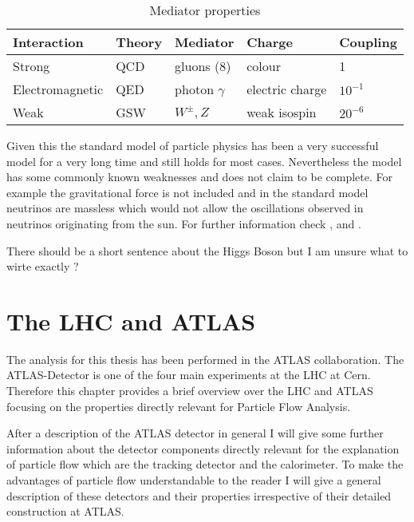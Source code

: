 \begin{table}[h]
\centering
\caption{Mediator properties}
\label{mediator properties}
\begin{tabular}{|l|l|l|l|l|}
\hline
Interaction     & Theory & Mediator        & Charge          & Coupling  \\ \hline
Strong          & QCD    & gluons (8)      & colour          & 1         \\ \hline
Electromagnetic & QED    & photon $\gamma$ & electric charge & $10^{-1}$ \\ \hline
Weak            & GSW    & $W^{\pm}, Z$    & weak isospin    & $20^{-6}$ \\ \hline
\end{tabular}
\end{table}

Given this the standard model of particle physics has been a very successful model for a very long time and still holds for most cases.
Nevertheless the model has some commonly known weaknesses and does not claim to be complete. For example the gravitational force is not included and in the standard model neutrinos are massless which would not allow the oscillations observed in neutrinos originating from the sun.
For further information check \cite{griffith08}, \cite{thomson13} and \cite{brock11}.

There should be a short sentence about the Higgs Boson but I am unsure what to wirte exactly ? 
\newpage





\section{The LHC and ATLAS}

The analysis for this thesis has been performed in the ATLAS collaboration. The ATLAS-Detector is one of the four main experiments at the LHC at Cern. Therefore this chapter provides a brief overview over the LHC and ATLAS focusing on the properties directly relevant for Particle Flow Analysis.

After a description of the ATLAS detector in general I will give some further information about the detector components directly relevant for the explanation of particle flow which are the tracking detector and the calorimeter. To make the advantages of particle flow understandable to the reader I will give a general description of these detectors and their properties irrespective of their detailed construction at ATLAS.

